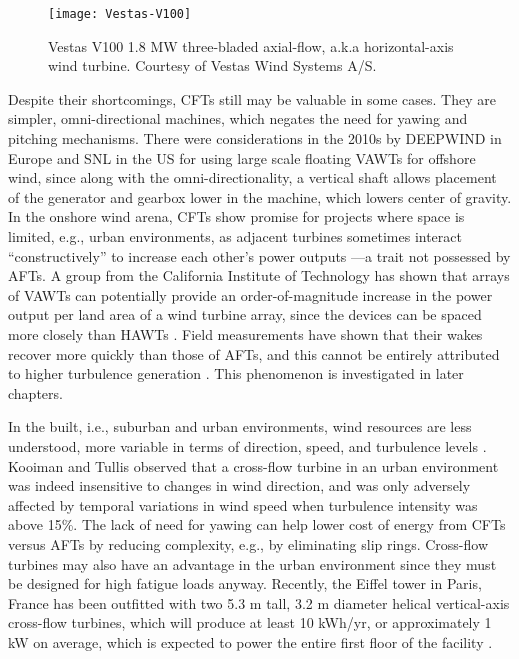 \begin{figure}[ht]
    \centering
    
    \texttt{[image: Vestas-V100]}
    
    \caption{Vestas V100 1.8 MW three-bladed axial-flow, a.k.a horizontal-axis
        wind turbine. Courtesy of Vestas Wind Systems A/S.}
    
    \label{fig:AFT}
\end{figure}

Despite their shortcomings, CFTs still may be valuable in some cases. They are
simpler, omni-directional machines, which negates the need for yawing and
pitching mechanisms. There were considerations in the 2010s by DEEPWIND in
Europe \cite{Paulsen2011} and SNL \cite{Sandia2012} in the US for using large
scale floating VAWTs for offshore wind, since along with the
omni-directionality, a vertical shaft allows placement of the generator and
gearbox lower in the machine, which lowers center of gravity. In the onshore
wind arena, CFTs show promise for projects where space is limited, e.g., urban
environments, as adjacent turbines sometimes interact ``constructively'' to
increase each other's power outputs \cite{Li2010}---a trait not possessed by
AFTs. A group from the California Institute of Technology has shown that arrays
of VAWTs can potentially provide an order-of-magnitude increase in the power
output per land area of a wind turbine array, since the devices can be spaced
more closely than HAWTs \cite{Dabiri2011}. Field measurements have shown that
their wakes recover more quickly than those of AFTs, and this cannot be entirely
attributed to higher turbulence generation \cite{Kinzel2012}. This phenomenon is
investigated in later chapters.

In the built, i.e., suburban and urban environments, wind resources are less
understood, more variable in terms of direction, speed, and turbulence levels
\cite{Smith2012}. Kooiman and Tullis \cite{Kooiman2010} observed that a
cross-flow turbine in an urban environment was indeed insensitive to changes in
wind direction, and was only adversely affected by temporal variations in wind
speed when turbulence intensity was above 15\%. The lack of need for yawing can
help lower cost of energy from CFTs versus AFTs by reducing complexity, e.g., by
eliminating slip rings. Cross-flow turbines may also have an advantage in the
urban environment since they must be designed for high fatigue loads anyway.
Recently, the Eiffel tower in Paris, France has been outfitted with two 5.3 m
tall, 3.2 m diameter helical vertical-axis cross-flow turbines, which will
produce at least 10 kWh/yr, or approximately 1 kW on average, which is expected
to power the entire first floor of the facility \cite{Lott2015}.

